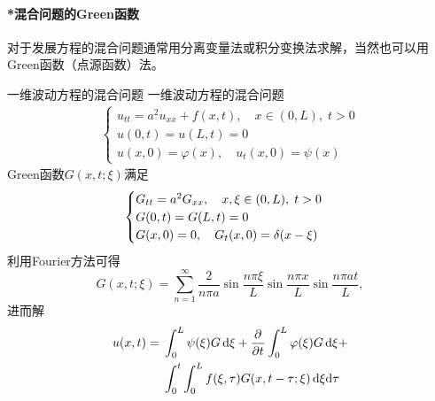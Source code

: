 \paragraph{*混合问题的Green函数}对于发展方程的混合问题通常用分离变量法或积分变换法求解，当然也可以用Green函数（点源函数）法。
\begin{example}{一维波动方程的混合问题}{}
	一维波动方程的混合问题
	\begin{align*}
		\begin{cases}
			u_{tt}=a^2u_{xx}+f(x,t),\quad x\in(0,L),\;t>0\\
			u(0,t)=u(L,t)=0\\
			u(x,0)=\varphi(x),\quad u_t(x,0)=\psi(x)
		\end{cases}
	\end{align*}
	Green函数$G(x,t;\xi)$满足 
	\begin{align*}
		\begin{cases}
			G_{tt}=a^2G_{xx},\quad x,\xi\in(0,L),\;t>0\\
			G(0,t)=G(L,t)=0\\
			G(x,0)=0,\quad G_t(x,0)=\mathop{}\!\delta(x-\xi)
		\end{cases}
	\end{align*}
	利用Fourier方法可得
	\[
		G(x,t;\xi)=\sum_{n=1}^\infty\frac2{n\pi a}\sin\frac{n\pi\xi}L\sin\frac{n\pi x}L\sin\frac{n\pi at}L,
	\]
	进而解
	\begin{align}
		\begin{aligned}
			u(x,t)={}&\int_0^L\psi(\xi)G\mathop{}\!\mathrm{d}\xi+\frac{\partial^{{}}}{\partial{t}^{{}}}\int_0^L\varphi(\xi)G\mathop{}\!\mathrm{d}\xi+\\
			&\int_0^t\int_0^L f(\xi,\tau)G(x,t-\tau;\xi)\mathop{}\!\mathrm{d}\xi\mathrm{d}\tau
		\end{aligned}
	\end{align}
\end{example}

% 
